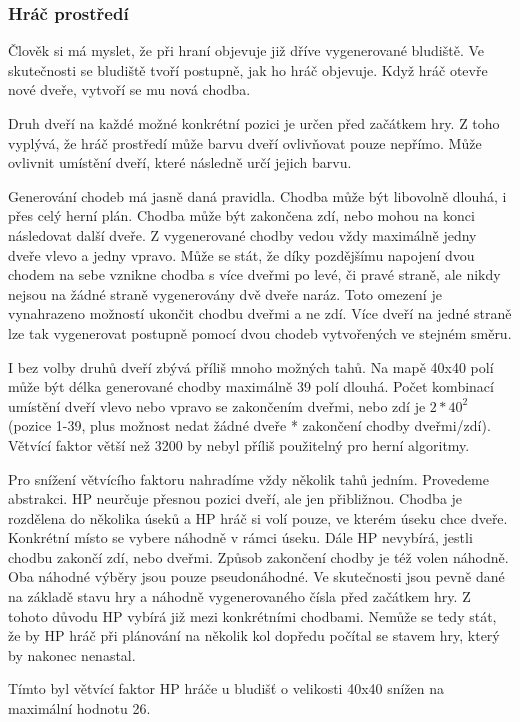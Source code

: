 \subsubsection{Hráč prostředí}

Člověk si má myslet, že při hraní objevuje již dříve vygenerované bludiště. Ve skutečnosti se bludiště tvoří postupně, jak ho hráč objevuje. Když hráč otevře nové dveře, vytvoří se mu nová chodba. 

Druh dveří na každé možné konkrétní pozici je určen před začátkem hry. Z toho vyplývá, že hráč prostředí může barvu dveří ovlivňovat pouze nepřímo. Může ovlivnit umístění dveří, které následně určí jejich barvu.

Generování chodeb má jasně daná pravidla. Chodba může být libovolně dlouhá, i přes celý herní plán. Chodba může být zakončena zdí, nebo mohou na konci následovat další dveře. Z vygenerované chodby vedou vždy maximálně jedny dveře vlevo a jedny vpravo. Může se stát, že díky pozdějšímu napojení dvou chodem na sebe vznikne chodba s více dveřmi po levé, či pravé straně, ale nikdy nejsou na žádné straně vygenerovány dvě dveře naráz. Toto omezení je vynahrazeno možností ukončit chodbu dveřmi a ne zdí. Více dveří na jedné straně lze tak vygenerovat postupně pomocí dvou chodeb vytvořených ve stejném směru.

I bez volby druhů dveří zbývá příliš mnoho možných tahů. Na mapě 40x40 polí může být délka generované chodby maximálně 39 polí dlouhá. Počet kombinací umístění dveří vlevo nebo vpravo se zakončením dveřmi, nebo zdí je $2*40^2$ (pozice 1-39, plus možnost nedat žádné dveře * zakončení chodby dveřmi/zdí). Větvící faktor větší než 3200 by nebyl příliš použitelný pro herní algoritmy. 

Pro snížení větvícího faktoru nahradíme vždy několik tahů jedním. Provedeme abstrakci. HP neurčuje přesnou pozici dveří, ale jen přibližnou. Chodba je rozdělena do několika úseků a HP hráč si volí pouze, ve kterém úseku chce dveře. Konkrétní místo se vybere náhodně v rámci úseku. Dále HP nevybírá, jestli chodbu zakončí zdí, nebo dveřmi. Způsob zakončení chodby je též volen náhodně. Oba náhodné výběry jsou pouze pseudonáhodné. Ve skutečnosti jsou pevně dané na základě stavu hry a náhodně vygenerovaného čísla před začátkem hry. Z tohoto důvodu HP vybírá již mezi konkrétními chodbami. Nemůže se tedy stát, že by HP hráč při plánování na několik kol dopředu počítal se stavem hry, který by nakonec nenastal.

Tímto byl větvící faktor HP hráče u bludišť o velikosti 40x40 snížen na maximální hodnotu 26.

